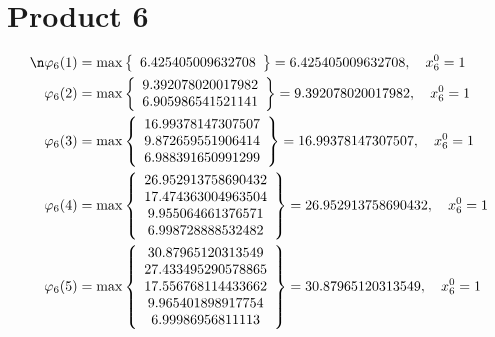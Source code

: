 \documentclass{article}
\begin{document}
\section{Product 6}
\begin{align*}
\n  
  
\varphi_{6}(1) &= \max \left\{ \begin{array}{c}
6.425405009632708
\end{array} \right\} = 6.425405009632708, \quad x_{6}^0 = 1\\
  
  
  
  
\varphi_{6}(2) &= \max \left\{ \begin{array}{c}
9.392078020017982 \\
 6.905986541521141
\end{array} \right\} = 9.392078020017982, \quad x_{6}^0 = 1\\
  
  
  
  
\varphi_{6}(3) &= \max \left\{ \begin{array}{c}
16.99378147307507 \\
 9.872659551906414 \\
 6.988391650991299
\end{array} \right\} = 16.99378147307507, \quad x_{6}^0 = 1\\
  
  
  
  
\varphi_{6}(4) &= \max \left\{ \begin{array}{c}
26.952913758690432 \\
 17.474363004963504 \\
 9.955064661376571 \\
 6.998728888532482
\end{array} \right\} = 26.952913758690432, \quad x_{6}^0 = 1\\
  
  
  
  
\varphi_{6}(5) &= \max \left\{ \begin{array}{c}
30.87965120313549 \\
 27.433495290578865 \\
 17.556768114433662 \\
 9.965401898917754 \\
 6.99986956811113
\end{array} \right\} = 30.87965120313549, \quad x_{6}^0 = 1\\
  
  
  

\end{align*}
\end{document}
